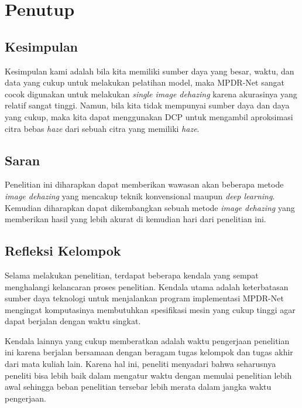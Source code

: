 \documentclass[11pt, a4paper, final]{report}
\begin{document}
\chapter{Penutup}

\section{Kesimpulan}
Kesimpulan kami adalah bila kita memiliki sumber daya yang besar, waktu, dan data yang cukup untuk melakukan pelatihan model, maka MPDR-Net sangat cocok digunakan untuk melakukan \textit{single image dehazing} karena akurasinya yang relatif sangat tinggi. Namun, bila kita tidak mempunyai sumber daya dan daya yang cukup, maka kita dapat menggunakan DCP untuk mengambil aproksimasi citra bebas \textit{haze} dari sebuah citra yang memiliki \textit{haze}.

\section{Saran}
Penelitian ini diharapkan dapat memberikan wawasan akan beberapa metode \textit{image dehazing} yang mencakup teknik konvensional maupun \textit{deep learning}. Kemudian diharapkan dapat dikembangkan sebuah metode \textit{image dehazing} yang memberikan hasil yang lebih akurat di kemudian hari dari penelitian ini.

\section {Refleksi Kelompok}
Selama melakukan penelitian, terdapat beberapa kendala yang sempat menghalangi kelancaran proses penelitian. Kendala utama adalah keterbatasan sumber daya teknologi untuk menjalankan program implementasi MPDR-Net mengingat komputasinya membutuhkan spesifikasi mesin yang cukup tinggi agar dapat berjalan dengan waktu singkat.

Kendala lainnya yang cukup memberatkan adalah waktu pengerjaan penelitian ini karena berjalan bersamaan dengan beragam tugas kelompok dan tugas akhir dari mata kuliah lain. Karena hal ini, peneliti menyadari bahwa seharusnya peneliti bisa lebih baik dalam mengatur waktu dengan memulai penelitian lebih awal sehingga beban penelitian tersebar lebih merata dalam jangka waktu pengerjaan.

\newpage
\nocite{*}


\end{document}

